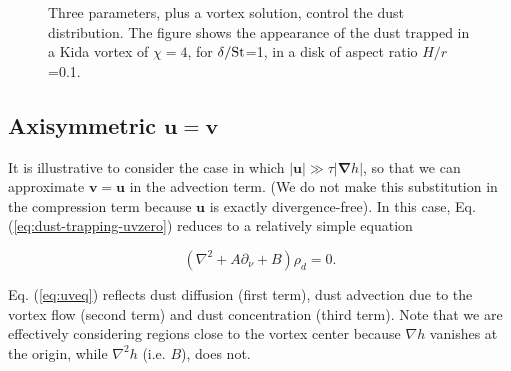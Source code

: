\documentclass[apj]{emulateapj}
\renewcommand{\v}[1]{{\boldsymbol{#1}}} %
\newcommand{\del}{\v{\nabla}}
\newcommand{\grad}{\del}
\newcommand{\Laplace}{\nabla^2}
\newcommand{\Eq}[1]{Eq. (\ref{#1})}
\newcommand{\eq}[1]{\Eq{#1}}
\newcommand{\beq}{\begin{equation}}
\newcommand{\eeq}{\end{equation}}
\newcommand{\St}{{\rm St}}
\begin{document}
\begin{figure}
\begin{center}
 \end{center}
\caption[]{Three parameters, plus a vortex solution, control the dust distribution. 
The figure shows the appearance of the dust trapped in a Kida vortex of $\chi=4$, 
for $\delta/\St$=1, in a disk of aspect ratio $H/r$=0.1.}
 \label{fig:disk}
\end{figure}

\subsection{Axisymmetric $\v{u} = \v{v}$ }
It is illustrative to consider the case in which $|\v{u}| \gg \tau|\grad{h}|$,
so that we can approximate $\v{v}=\v{u}$ in the advection term. (We do
not make this substitution in the compression term because $\v{u}$ is
exactly divergence-free). In this case, \eq{eq:dust-trapping-uvzero} reduces
to a relatively simple equation 

\beq\label{eq:uveq}
\left(\Laplace{} + A\partial_\nu + B \right)\rho_d = 0. 
\eeq

\eq{eq:uveq} reflects dust diffusion (first term), dust advection due
to the vortex flow (second term) and dust concentration (third term). 
Note that we are effectively considering regions close to the vortex
center because $\nabla h$ vanishes at the origin, while $\nabla^2h$
(i.e. $B$), does not.   
\end{document}
